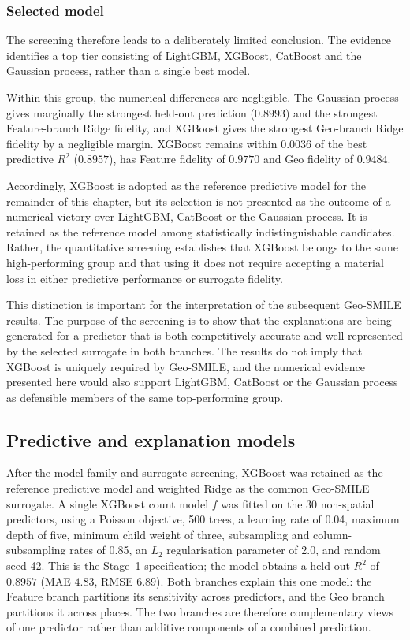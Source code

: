 \subsubsection{Selected model}
\label{sec}

The screening therefore leads to a deliberately limited conclusion. The evidence identifies a top tier consisting of LightGBM, XGBoost, CatBoost and the Gaussian process, rather than a single best model.

Within this group, the numerical differences are negligible. The Gaussian process gives marginally the strongest held-out prediction ($0.8993$) and the strongest Feature-branch Ridge fidelity, and XGBoost gives the strongest Geo-branch Ridge fidelity by a negligible margin. XGBoost remains within $0.0036$ of the best predictive $R^2$ ($0.8957$), has Feature fidelity of $0.9770$ and Geo fidelity of $0.9484$.

Accordingly, XGBoost is adopted as the reference predictive model for the remainder of this chapter, but its selection is not presented as the outcome of a numerical victory over LightGBM, CatBoost or the Gaussian process. It is retained as the reference model among statistically indistinguishable candidates. Rather, the quantitative screening establishes that XGBoost belongs to the same high-performing group and that using it does not require accepting a material loss in either predictive performance or surrogate fidelity.

This distinction is important for the interpretation of the subsequent Geo-SMILE results. The purpose of the screening is to show that the explanations are being generated for a predictor that is both competitively accurate and well represented by the selected surrogate in both branches. The results do not imply that XGBoost is uniquely required by Geo-SMILE, and the numerical evidence presented here would also support LightGBM, CatBoost or the Gaussian process as defensible members of the same top-performing group.



\subsection{Predictive and explanation models}
\label{sec:hull_models}

After the model-family and surrogate screening, XGBoost was retained as the reference predictive model and weighted Ridge as the common Geo-SMILE surrogate. A single XGBoost count model $f$ was fitted on the 30 non-spatial predictors, using a Poisson objective, 500 trees, a learning rate of 0.04, maximum depth of five, minimum child weight of three, subsampling and column-subsampling rates of 0.85, an $L_2$ regularisation parameter of 2.0, and random seed 42. This is the Stage~1 specification; the model obtains a held-out $R^2$ of $0.8957$ (MAE $4.83$, RMSE $6.89$). Both branches explain this one model: the Feature branch partitions its sensitivity across predictors, and the Geo branch partitions it across places. The two branches are therefore complementary views of one predictor rather than additive components of a combined prediction.

